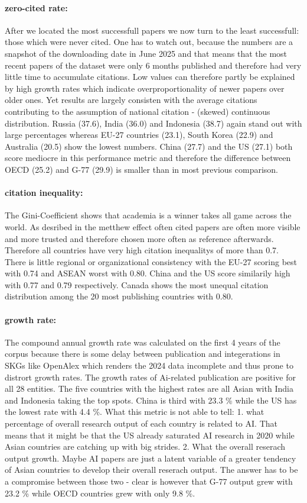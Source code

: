 \documentclass{article}
\begin{document}
\paragraph{zero-cited rate:} After we located the most successfull papers we now turn to the least successfull: those which were never cited. One has to watch out, because the numbers are a snapshot of the downloading date in June 2025 and that means that the most recent papers of the dataset were only 6 months published and therefore had very little time to accumulate citations. Low values can therefore partly be explained by high growth rates which indicate overproportionality of newer papers over older ones. Yet results are largely consisten with the average citations contributing to the assumption of national citation - (skewed) continuous distribution. Russia (37.6), India (36.0) and Indonesia (38.7) again stand out with large percentages whereas EU-27 countries (23.1), South Korea (22.9) and Australia (20.5) show the lowest numbers. China (27.7) and the US (27.1) both score mediocre in this performance metric and therefore the difference between OECD (25.2) and G-77 (29.9) is smaller than in most previous comparison.

\paragraph{citation inequality:} The Gini-Coefficient shows that academia is a winner takes all game across the world. As desribed in the metthew effect often cited papers are often more visible and more trusted and therefore chosen more often as reference afterwards. Therefore all countries have very high citation inequalitys of more than 0.7. There is little regional or organizational consistency with the EU-27 scoring best with 0.74 and ASEAN worst with 0.80. China and the US score similarily high with 0.77 and 0.79 respectively. Canada shows the most unequal citation distribution among the 20 most publishing countries with 0.80.

\paragraph{growth rate:} The compound annual growth rate was calculated on the first 4 years of the corpus because there is some delay between publication and integerations in SKGs like OpenAlex which renders the 2024 data incomplete and thus prone to distrort growth rates. The growth rates of Ai-related publication are positive for all 28 entities. The five countries with the highest rates are all Asian with India and Indonesia taking the top spots. China is third with 23.3 \% while the US has the lowest rate with 4.4 \%. What this metric is not able to tell: 1. what percentage of overall research output of each country is related to AI. That means that it might be that the US already saturated AI research in 2020 while Asian countries are catching up with big strides. 2. What the overall reserach output growth. Maybe AI papers are just a latent variable of a greater tendency of Asian countries to develop their overall reserach output. The answer has to be a compromise between those two - clear is however that G-77 output grew with 23.2 \% while OECD countries grew with only 9.8 \%. 
\end{document}
